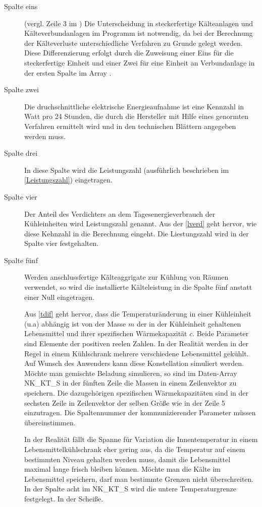 \begin{description}

	\item [{Spalte eins}] (vergl. Zeile 3 im ) Die Unterscheidung in
	steckerfertige Kälteanlagen und Kälteverbundanlagen im Programm ist notwendig, da bei der Berechnung der
	Kälteverluste unterschiedliche Verfahren zu Grunde gelegt werden.  Diese
	Differenzierung erfolgt durch die Zuweisung einer Eins für die steckerfertige Einheit und einer Zwei für eine Einheit
	an Verbundanlage in der ersten Spalte im Array .

	\item [{Spalte zwei}] Die druchschnittliche elektrische Energieaufnahme ist eine Kennzahl in Watt pro 24 Stunden, die
	durch die Hersteller mit Hilfe eines genormten Verfahren ermittelt wird und in den technischen Blättern angegeben
	werden muss.

	\item [{Spalte drei}] In diese Spalte wird die Leistungszahl (ausführlich beschrieben im \cref{Leistungszahl})
	eingetragen.

	\item [{Spalte vier}] Der Anteil des Verdichters an dem Tagesenergieverbrauch der Kühleinheiten wird Leistungszahl
	genannt. Aus der \cref{lverd} geht hervor, wie diese Kehnzahl in die Berechnung eingeht. Die Liestungszahl wird in
	der Spalte vier festgehalten.

	\item [{Spalte fünf}] Werden anschlussfertige Kälteaggrigate zur Kühlung von Räumen verwendet, so wird die
	installierte Kälteleistung in die Spalte fünf anstatt einer Null eingetragen.
	
	
	Aus \cref{tdif} geht hervor, dass die Temperaturänderung in einer Kühleinheit (u.a) abhängig
	ist von der Masse $m$ der in der Kühleinheit gehaltenen Lebensmittel und ihrer spezifischen Wärmekapazität $c$. Beide
	Parameter sind Elemente der positiven reelen Zahlen.  In der Realität werden in der Regel in einem Kühlschrank
	mehrere verschiedene Lebensmittel gekühlt.  Auf Wunsch des Anwenders kann diese Konstellation simuliert werden.
	Möchte man gemischte Beladung simulieren, so sind im Daten-Array NK\_KT\_S in der fünften Zeile die Massen in einem
	Zeilenvektor zu speichern. Die dazugehörigen spezifischen Wärmekapazitäten sind in der sechsten Zeile in Zeilenvektor
	der selben Größe wie in der Zeile 5 einzutragen. Die Spaltennummer der kommunizierender
	Parameter müssen übereinstimmen.

In der Realität fällt die Spanne für Variation die Innentemperatur in einem Lebensmittelkühlschrank eher gering aus, da die
Temperatur auf einem bestimmten Niveau gehalten werden muss, damit die Lebensmittel maximal lange frisch bleiben können.
Möchte man die Kälte im Lebensmittel speichern, darf man bestimmte Grenzen nicht überschreiten. In der Spalte acht im
NK\_KT\_S wird die untere Temperaturgrenze festgelegt. In der Scheiße.

\end{description}
